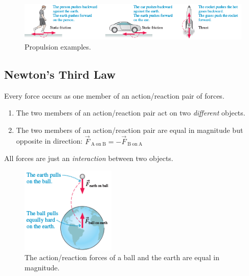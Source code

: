 \begin{figure}
    \centering
    \includegraphics[width=\textwidth]{../figures/propulsion-examples.png}
    \caption{Propulsion examples.}%
    \label{fig:propulsion}
\end{figure}

\subsection{Newton's Third Law}

\begin{theorem}
    Every force occurs as one member of an action/reaction pair of
    forces.
    \begin{enumerate}
        \item
            The two members of an action/reaction pair act on two \emph{different}
            objects.
        \item
            The two members of an action/reaction pair are equal in
            magnitude but opposite in direction:
            $
                \vec{F}_{\mathrm{~A~on~B}} = -\vec{F}_{\mathrm{~B~on~A}}
            $
    \end{enumerate}
    \label{theo:newtons-third-law}
\end{theorem}
\begin{remark}
    All forces are just an \emph{interaction} between two objects.
\end{remark}

\begin{figure}
    \centering
    \includegraphics[width=0.4\textwidth]{../figures/ball-dropping-action-reaction.png}
    \caption{The action/reaction forces of a ball and the earth are
    equal in magnitude.}%
    \label{fig:ball-dropping}
\end{figure}

